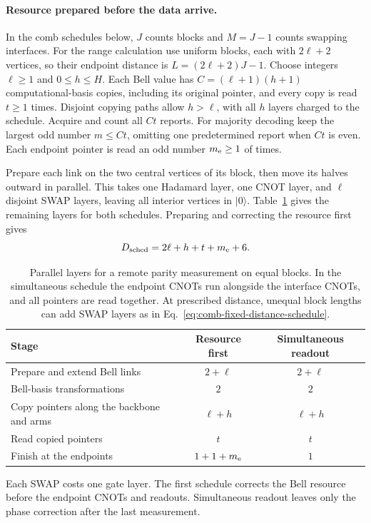\documentclass[aps,prl,twocolumn,superscriptaddress,longbibliography,reprint,floatfix]{revtex4-2}
\begin{document}
\paragraph*{Resource prepared before the data arrive.}
In the comb schedules below, $J$ counts blocks and $M=J-1$ counts swapping interfaces. For the range calculation use uniform blocks, each with
$2\ell+2$ vertices, so their endpoint distance is $L=(2\ell+2)J-1$.
Choose integers $\ell\ge1$ and $0\le h\le H$. Each Bell value has
$C=(\ell+1)(h+1)$ computational-basis copies, including its original
pointer, and every copy is read $t\ge1$ times. Disjoint copying paths
allow $h>\ell$, with all $h$ layers charged to the schedule. Acquire
and count all $Ct$ reports. For majority decoding keep the largest odd
number $m\le Ct$, omitting one predetermined report when $Ct$ is even. Each endpoint pointer is read an odd
number $m_{\rm e}\ge1$ of times.

Prepare each link on the two central vertices of its block, then move
its halves outward in parallel. This takes one Hadamard layer, one
CNOT layer, and $\ell$ disjoint SWAP layers, leaving all interior
vertices in $|0\rangle$. Table~\ref{tab:comb-layers} gives the remaining
layers for both schedules. Preparing and correcting the resource first gives
\begin{equation}
 D_{\rm sched}=2\ell+h+t+m_{\rm e}+6.
 \label{eq:comb-layer-schedule}
\end{equation}
\begin{table}[tb]
\caption{Parallel layers for a remote parity measurement on equal blocks.
In the simultaneous schedule the endpoint CNOTs run alongside the interface
CNOTs, and all pointers are read together. At prescribed distance, unequal
block lengths can add SWAP layers as in Eq.~\eqref{eq:comb-fixed-distance-schedule}.}
\label{tab:comb-layers}
\centering
\begin{tabular}{@{}lcc@{}}
\toprule
Stage & Resource first & Simultaneous readout\\
\midrule
Prepare and extend Bell links & $2+\ell$ & $2+\ell$\\
Bell-basis transformations & $2$ & $2$\\
Copy pointers along the backbone and arms & $\ell+h$ & $\ell+h$\\
Read copied pointers & $t$ & $t$\\
Finish at the endpoints & $1+1+m_{\rm e}$ & $1$\\
\bottomrule
\end{tabular}
\end{table}
Each SWAP costs one gate layer. The first schedule corrects the Bell
resource before the endpoint CNOTs and readouts. Simultaneous readout
leaves only the phase correction after the last measurement.
\end{document}
